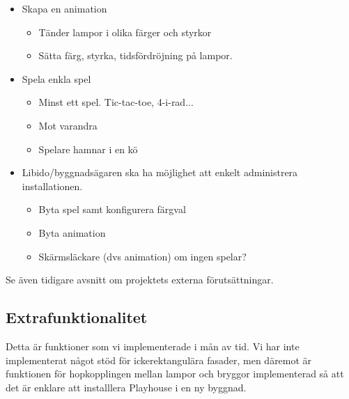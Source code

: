 \documentclass[a4paper,11pt]{article}
\begin{document}
  \begin{itemize}
    \item Skapa en animation
      \begin{itemize}
        \item Tänder lampor i olika färger och styrkor
        \item Sätta färg, styrka, tidsfördröjning på lampor.
      \end{itemize}

    \item Spela enkla spel
      \begin{itemize}
        \item Minst ett spel. Tic-tac-toe, 4-i-rad...
        \item Mot varandra
        \item Spelare hamnar i en kö
      \end{itemize}

    \item Libido/byggnadsägaren ska ha möjlighet att enkelt administrera
          installationen.
      \begin{itemize}
        \item Byta spel samt konfigurera färgval
        \item Byta animation
        \item Skärmsläckare (dvs animation) om ingen spelar?
      \end{itemize}
  \end{itemize}

  Se även tidigare avsnitt om projektets externa förutsättningar.


\subsection{Extrafunktionalitet}
  Detta är funktioner som vi implementerade i mån av tid.  Vi har inte
  implementerat något stöd för ickerektangulära fasader, men däremot är
  funktionen för hopkopplingen mellan lampor och bryggor implementerad så att
  det är enklare att installlera Playhouse i en ny byggnad.
\end{document}
